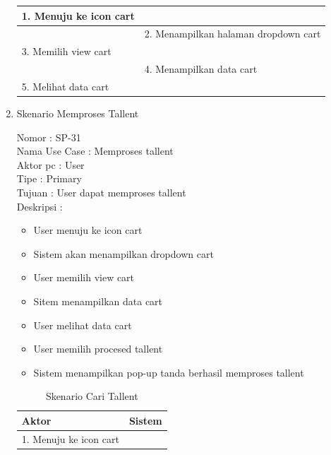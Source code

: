 \begin{enumerate}
\begin{table}
\begin{tabular}{ | l | p{70mm}|}
		1.	Menuju ke icon cart&  \\
		
		\hline
		
		&  2.	Menampilkan halaman  dropdown cart \\
		
		\hline
		
		3. Memilih view cart & \\
		
		\hline
		
		& 4. Menampilkan data cart \\
		\hline
		
		5. Melihat data cart & \\
		\hline
		
		
	\end{tabular}
\end{table}

\item Skenario Memproses Tallent

Nomor \kern 3.6pc : SP-31 \\
Nama Use Case : Memproses tallent \\
Aktor  pc : User \\
Tipe \kern 4.6pc : Primary \\
Tujuan \kern 3.6pc : User dapat memproses tallent \\
Deskripsi \kern 2.5pc : 

\begin{itemize}
	\item User menuju ke icon cart
	\item Sistem akan menampilkan dropdown cart
	\item User memilih view cart
	\item Sitem menampilkan data cart
	\item User melihat data cart
	\item User memilih procesed tallent
	\item Sistem menampilkan pop-up tanda berhasil memproses tallent
	
\end{itemize}

\begin{table}
	\caption{Skenario Cari Tallent}
	\centering
	\begin{tabular}{ | l | p{70mm}|}
		\hline 
		\textbf{Aktor} & \textbf{Sistem} \\
		\hline
		
			1.	Menuju ke icon cart&  \\
			

\end{tabular}
\end{table}
\end{enumerate}
